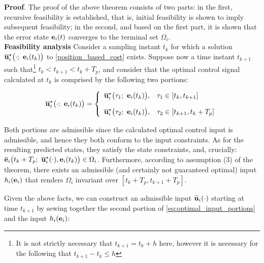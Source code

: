 \textbf{Proof}. The proof of the above theorem consists of two parts:
in the first, recursive feasibility is established, that is, initial
feasibility is shown to imply subsequent feasibility; in the second, and based
on the first part, it is shown that the error state $\bm{\mathbf{e}}_i(t)$ converges
to the terminal set $\Omega_i$.\\[2.5ex]

\textbf{Feasibility analysis}
Consider a sampling instant $t_k$ for which a
solution $\overline{\vect{u}}_i^{\star}\big(\cdot;\ \vect{e}_i(t_k)\big)$ to
\eqref{position_based_cost} exists.
Suppose now a time instant $t_{k+1}$ such that\footnote{It is not strictly necessary
that $t_{k+1} = t_k + h$ here, however it is necessary for the following that
$t_{k+1} - t_k \leq h$} $t_k < t_{k+1} < t_k + T_p$, and consider that the
optimal control signal calculated at $t_k$ is comprised by the following two
portions:

\begin{equation}
  \overline{\vect{u}}_i^{\star}\big(\cdot;\ \vect{e}_i(t_k)\big) = \left\{
      \begin{array}{ll}
        \overline{\vect{u}}_i^{\star}\big(\tau_1;\ \vect{e}_i(t_k)\big), & \tau_1 \in [t_k, t_{k+1}] \\[2.5ex]
        \overline{\vect{u}}_i^{\star}\big(\tau_2;\ \vect{e}_i(t_k)\big), & \tau_2 \in [t_{k+1}, t_k + T_p]
      \end{array}
      \right.
  \label{eq:optimal_input_portions}
\end{equation}

Both portions are admissible since the calculated optimal control input is
admissible, and hence they both conform to the input constraints.
As for the resulting predicted states, they satisfy the state constraints, and,
crucially: $\overline{\vect{e}}_i\big(t_k + T_p;\ \overline{\vect{u}}_i^{\star}(\cdot), \vect{e}_i(t_k)\big) \in \Omega_i$.
Furthermore, according to assumption (3) of the theorem, there exists an
admissible (and certainly not guaranteed optimal) input $h_i(\bm{\mathbf{e}}_i)$ that
renders $\Omega_i$ invariant over $[t_k + T_p, t_{k+1} + T_p]$.

Given the above facts, we can construct an admissible input
$\widetilde{\bm{\mathbf{u}}}_i(\cdot)$  starting at time $t_{k+1}$ by sewing together
the second portion of \eqref{eq:optimal_input_portions} and the input
$h_i(\bm{\mathbf{e}}_i)$:

